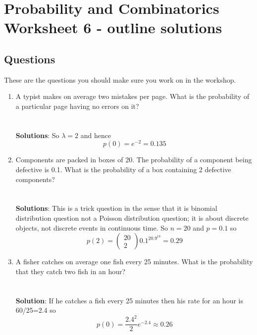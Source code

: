 \documentclass[11pt,a4paper]{scrartcl}
\begin{document}
\section*{Probability and Combinatorics Worksheet 6 - outline solutions}


\subsection*{Questions}

These are the questions you should make sure you work on in the workshop.

\begin{enumerate}

\item A typist makes on average two mistakes per page. What is the probability of a particular page having no errors on it?\\
  \\
  \\
  \textbf{Solutions}: So $\lambda=2$ and hence
  \begin{equation}
    p(0)=e^{-2}=0.135
  \end{equation}  

\item Components are packed in boxes of 20. The probability of a
  component being defective is 0.1. What is the probability of a box
  containing 2 defective components?\\ \\ \\ \textbf{Solutions}: This
  is a trick question in the sense that it is binomial distribution
  question not a Poisson distribution question; it is about discrete
  objects, not discrete events in continuous time. So $n=20$ and $p=0.1$ so
  \begin{equation}
    p(2)=\left(\begin{array}{c}20\\2\end{array}\right)0.1^20.9^{18}=0.29
  \end{equation}
 
\item A fisher catches on average one fish every 25 minutes. What is
  the probability that they catch two fish in an hour?
  \\ \\ \\ \textbf{Solution}: If he catches a fish every 25
  minutes then his rate for an hour is 60/25=2.4 so
\begin{equation}
p(0)=\frac{2.4^2}{2}e^{-2.4}\approx 0.26
\end{equation}


\end{enumerate}
\end{document}
